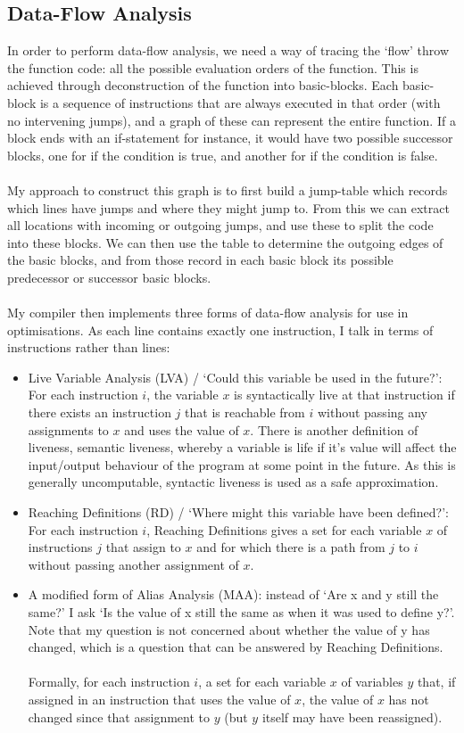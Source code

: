 \subsection{Data-Flow Analysis}
In order to perform data-flow analysis, we need a way of tracing the `flow' throw the function code: all the possible evaluation orders of the function. This is achieved through deconstruction of the function into basic-blocks. Each basic-block is a sequence of instructions that are always executed in that order (with no intervening jumps), and a graph of these can represent the entire function. If a block ends with an if-statement for instance, it would have two possible successor blocks, one for if the condition is true, and another for if the condition is false.
\\\\
My approach to construct this graph is to first build a jump-table which records which lines have jumps and where they might jump to. From this we can extract all locations with incoming or outgoing jumps, and use these to split the code into these blocks. We can then use the table to determine the outgoing edges of the basic blocks, and from those record in each basic block its possible predecessor or successor basic blocks.
\\\\
My compiler then implements three forms of data-flow analysis for use in optimisations. As each line contains exactly one instruction, I talk in terms of instructions rather than lines:
\begin{itemize}
\item Live Variable Analysis (LVA) / `Could this variable be used in the future?': For each instruction $i$, the variable $x$ is syntactically live at that instruction if there exists an instruction $j$ that is reachable from $i$ without passing any assignments to $x$ and uses the value of $x$. There is another definition of liveness, semantic liveness, whereby a variable is life if it's value will affect the input/output behaviour of the program at some point in the future. As this is generally uncomputable, syntactic liveness is used as a safe approximation.
\item Reaching Definitions (RD) / `Where might this variable have been defined?': For each instruction $i$, Reaching Definitions gives a set for each variable $x$ of instructions $j$ that assign to $x$ and for which there is a path from $j$ to $i$ without passing another assignment of $x$.
\item A modified form of Alias Analysis (MAA): instead of `Are x and y still the same?' I ask `Is the value of x still the same as when it was used to define y?'. Note that my question is not concerned about whether the value of y has changed, which is a question that can be answered by Reaching Definitions.
\\\\Formally, for each instruction $i$, a set for each variable $x$ of variables $y$ that, if assigned in an instruction that uses the value of $x$, the value of $x$ has not changed since that assignment to $y$ (but $y$ itself may have been reassigned).
\end{itemize}

